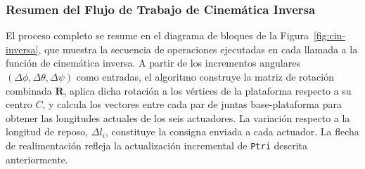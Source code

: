 \begin{enumerate}
\subsubsection{Resumen del Flujo de Trabajo de Cinemática Inversa}

El proceso completo se resume en el diagrama de bloques de la Figura~\ref{fig:cin-inversa}, que muestra la secuencia de operaciones ejecutadas en cada llamada a la función de cinemática inversa. A partir de los incrementos angulares $(\Delta\phi,\Delta\theta,\Delta\psi)$ como entradas, el algoritmo construye la matriz de rotación combinada $\mathbf{R}$, aplica dicha rotación a los vértices de la plataforma respecto a su centro $C$, y calcula los vectores entre cada par de juntas base-plataforma para obtener las longitudes actuales de los seis actuadores. La variación respecto a la longitud de reposo, $\Delta l_i$, constituye la consigna enviada a cada actuador. La flecha de realimentación refleja la actualización incremental de \texttt{Ptri} descrita anteriormente.

\begin{figure}[htbp]
    \centering
\end{figure}
\end{enumerate}

